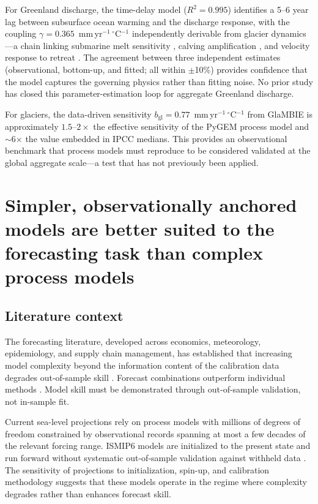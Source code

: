 \documentclass[11pt]{article}
\begin{document}
For Greenland discharge, the time-delay model ($R^2 = 0.995$) identifies a 5--6 year lag between subsurface ocean warming and the discharge response, with the coupling $\gamma = 0.365$~mm\,yr$^{-1}$\,$^\circ$C$^{-1}$ independently derivable from glacier dynamics---a chain linking submarine melt sensitivity \citep{Xu2013, Rignot2016}, calving amplification \citep{Benn2007, Luckman2015}, and velocity response to retreat \citep{King2020}. The agreement between three independent estimates (observational, bottom-up, and fitted; all within $\pm$10\%) provides confidence that the model captures the governing physics rather than fitting noise. No prior study has closed this parameter-estimation loop for aggregate Greenland discharge.

For glaciers, the data-driven sensitivity $b_{\mathrm{gl}} = 0.77$~mm\,yr$^{-1}$\,$^\circ$C$^{-1}$ from GlaMBIE is approximately $1.5$--$2\times$ the effective sensitivity of the PyGEM process model \citep{Rounce2023} and $\sim$6$\times$ the value embedded in IPCC medians. This provides an observational benchmark that process models must reproduce to be considered validated at the global aggregate scale---a test that has not previously been applied.

\section{Simpler, observationally anchored models are better suited to the forecasting task than complex process models}
\label{sec:takeaway_forecasting}

\subsection{Literature context}

The forecasting literature, developed across economics, meteorology, epidemiology, and supply chain management, has established that increasing model complexity beyond the information content of the calibration data degrades out-of-sample skill \citep{Green2015}. Forecast combinations outperform individual methods \citep{Makridakis2020}. Model skill must be demonstrated through out-of-sample validation, not in-sample fit.

Current sea-level projections rely on process models with millions of degrees of freedom constrained by observational records spanning at most a few decades of the relevant forcing range. ISMIP6 models are initialized to the present state and run forward without systematic out-of-sample validation against withheld data \citep{Aschwanden2021, Fricker2025}. The sensitivity of projections to initialization, spin-up, and calibration methodology \citep{Goldberg2026} suggests that these models operate in the regime where complexity degrades rather than enhances forecast skill.
\end{document}
